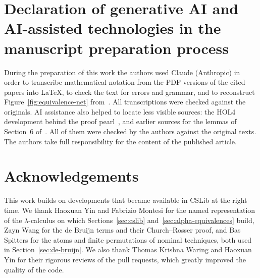 \documentclass[a4paper,fleqn]{cas-sc}
\begin{document}
\section*{Declaration of generative AI and AI-assisted technologies in the manuscript preparation process}
During the preparation of this work the authors used Claude
(Anthropic) in order to transcribe mathematical notation from the PDF
versions of the cited papers into \LaTeX{}, to check the text for
errors and grammar, and to reconstruct
Figure~\ref{fig:equivalence-net} from~\cite[Figure~1]{norrish2007a}.
All transcriptions were checked against the originals. AI assistance
also helped to locate less visible sources: the HOL4 development behind the
proof pearl~\cite{norrish2007a}, and earlier sources for the lemmas of
Section~6 of~\cite{crole2012a}. All of them were checked by the
authors against the original texts. The authors take full
responsibility for the content of the published article.

\section*{Acknowledgements}
This work builds on developments that became available in CSLib at
the right time. We thank Haoxuan Yin and Fabrizio Montesi for the named
representation of the $\lambda$-calculus on which
Sections~\ref{sec:cslib} and~\ref{sec:alpha-equivalences} build,
Zayn Wang for the de Bruijn terms and their
Church--Rosser proof, and Bas Spitters for the atoms and finite
permutations of nominal techniques, both used in
Section~\ref{sec:de-bruijn}. We also thank Thomas Krishna Waring and
Haoxuan Yin for their rigorous reviews of the pull requests, which
greatly improved the quality of the code.



\end{document}

